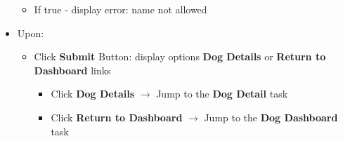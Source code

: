 \documentclass{article}
\begin{document}
\begin{itemize}
\begin{itemize}
        \item If true - display error: name not allowed
    \end{itemize}
    \item Upon:
    \begin{itemize}
        \item Click \textbf{Submit} Button: display options \textbf{Dog Details} or \textbf{Return to Dashboard} links
        \begin{itemize}
            \item Click \textbf{Dog Details} $\rightarrow$ Jump to the \textbf{Dog Detail} task
            \item Click \textbf{Return to Dashboard} $\rightarrow$ Jump to the \textbf{Dog Dashboard} task
        \end{itemize}
    \end{itemize}
\end{itemize}
\end{document}
